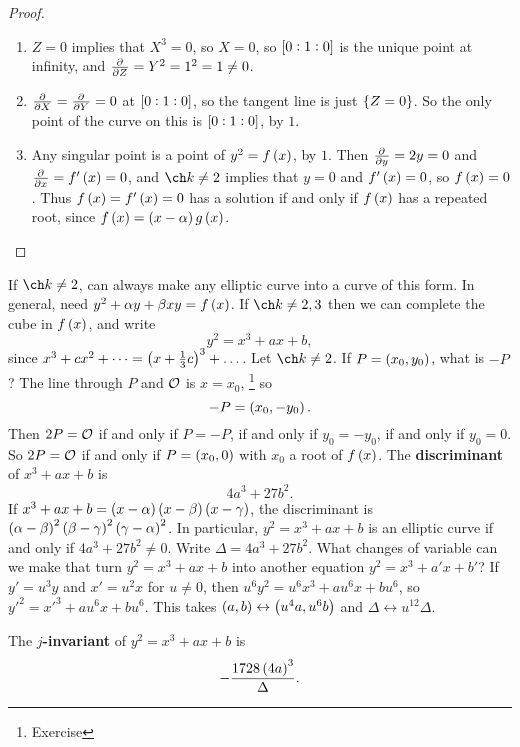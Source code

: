 \begin{proof}
\hfill
\begin{enumerate}
\item $ Z = 0 $ implies that $ X^3 = 0 $, so $ X = 0 $, so $ \sbr{0 : 1 : 0} $ is the unique point at infinity, and $ \tpd{}{Z} = Y^2 = 1^2 = 1 \ne 0 $.
\item $ \tpd{}{X} = \tpd{}{Y} = 0 $ at $ \sbr{0 : 1 : 0} $, so the tangent line is just $ \cbr{Z = 0} $. So the only point of the curve on this is $ \sbr{0 : 1 : 0} $, by $ 1 $.
\item Any singular point is a point of $ y^2 = f\br{x} $, by $ 1 $. Then $ \tpd{}{y} = 2y = 0 $ and $ \tpd{}{x} = f'\br{x} = 0 $, and $ \ch k \ne 2 $ implies that $ y = 0 $ and $ f'\br{x} = 0 $, so $ f\br{x} = 0 $. Thus $ f\br{x} = f'\br{x} = 0 $ has a solution if and only if $ f\br{x} $ has a repeated root, since $ f\br{x} = \br{x - \alpha}g\br{x} $.
\end{enumerate}
\end{proof}

If $ \ch k \ne 2 $, can always make any elliptic curve into a curve of this form. In general, need $ y^2 + \alpha y + \beta xy = f\br{x} $. If $ \ch k \ne 2, 3 $ then we can complete the cube in $ f\br{x} $, and write
$$ y^2 = x^3 + ax + b, $$
since $ x^3 + cx^2 + \dots = \br{x + \tfrac{1}{3}c}^3 + \dots $. Let $ \ch k \ne 2 $. If $ P = \br{x_0, y_0} $, what is $ -P $? The line through $ P $ and $ \mathcal{O} $ is $ x = x_0 $, \footnote{Exercise} so
$$ -P = \br{x_0, -y_0}. $$
Then $ 2P = \mathcal{O} $ if and only if $ P = -P $, if and only if $ y_0 = -y_0 $, if and only if $ y_0 = 0 $. So $ 2P = \mathcal{O} $ if and only if $ P = \br{x_0, 0} $ with $ x_0 $ a root of $ f\br{x} $. The \textbf{discriminant} of $ x^3 + ax + b $ is
$$ 4a^3 + 27b^2. $$
If $ x^3 + ax + b = \br{x - \alpha}\br{x - \beta}\br{x - \gamma} $, the discriminant is $ \br{\alpha - \beta}^2\br{\beta - \gamma}^2\br{\gamma - \alpha}^2 $. In particular, $ y^2 = x^3 + ax + b $ is an elliptic curve if and only if $ 4a^3 + 27b^2 \ne 0 $. Write $ \Delta = 4a^3 + 27b^2 $. What changes of variable can we make that turn $ y^2 = x^3 + ax + b $ into another equation $ y^2 = x^3 + a'x + b' $? If $ y' = u^3y $ and $ x' = u^2x $ for $ u \ne 0 $, then $ u^6y^2 = u^6x^3 + au^6x + bu^6 $, so $ y'^2 = x'^3 + au^6x + bu^6 $. This takes $ \br{a, b} \leftrightarrow \br{u^4a, u^6b} $ and $ \Delta \leftrightarrow u^{12}\Delta $.

\begin{definition}
The \textbf{$ j $-invariant} of $ y^2 = x^3 + ax + b $ is
$$ -\dfrac{1728\br{4a}^3}{\Delta}. $$
\end{definition}

